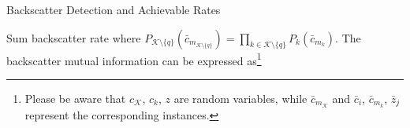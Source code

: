 \documentclass[journal]{IEEEtran}
\begin{document}
\begin{section}{Backscatter Detection and Achievable Rates}
\begin{subsection}{Sum backscatter rate}
			where $P_{\mathcal{K} \setminus \{q\}}(\bar{c}_{m_{\mathcal{K} \setminus \{q\}}}) = \prod_{k \in \mathcal{K} \setminus \{q\}} P_k(\bar{c}_{m_k})$. The backscatter mutual information can be expressed as\footnote{Please be aware that $c_{\mathcal{K}}$, $c_k$, $z$ are random variables, while $\bar{c}_{m_{\mathcal{K}}}$ and $\bar{c}_i$, $\bar{c}_{m_k}$, $\bar{z}_j$ represent the corresponding instances.}
			\begin{subequations}

\end{subequations}
\end{subsection}
\end{section}
\end{document}
